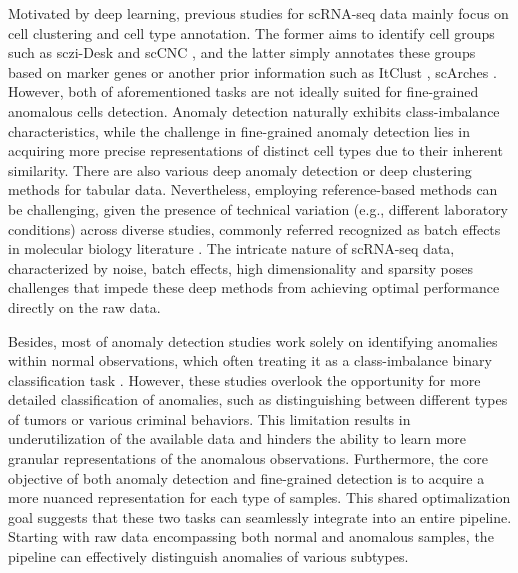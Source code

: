 \documentclass{article}
\begin{document}
Motivated by deep learning, previous studies for scRNA-seq data mainly focus on cell 
clustering and cell type annotation. The former aims to identify cell groups such as sczi-Desk \cite{sczi-Desk} 
and scCNC \cite{scCNC}, and the latter simply annotates these groups based on marker genes or another prior 
information such as ItClust \cite{ItClust}, scArches \cite{scArches}. 
However, both of aforementioned tasks are not ideally suited for fine-grained anomalous cells detection. 
Anomaly detection naturally exhibits class-imbalance characteristics, while the challenge 
in fine-grained anomaly detection lies in acquiring more precise representations of distinct cell types 
due to their inherent similarity. There are also various deep anomaly detection or deep 
clustering methods for tabular data. Nevertheless, employing reference-based methods can be challenging, given the presence of 
technical variation (e.g., different laboratory conditions) across diverse studies, 
commonly referred recognized as batch effects in molecular biology literature \cite{Polyphony}. 
The intricate nature of scRNA-seq data, characterized by noise, batch effects, high 
dimensionality and sparsity \cite{dands} poses challenges that impede these deep 
methods from achieving optimal performance directly on the raw data.

Besides, most of anomaly detection studies work solely on identifying anomalies within normal 
observations, which often treating it as a class-imbalance binary classification task \cite{OA}. 
However, these studies overlook the opportunity for more detailed classification of 
anomalies, such as distinguishing between different types of tumors or various criminal 
behaviors. This limitation results in underutilization of the available data and hinders 
the ability to learn more granular representations of the anomalous observations. 
Furthermore, the core objective of both anomaly detection and fine-grained detection is to 
acquire a more nuanced representation for each type of samples. This shared optimalization 
goal suggests that these two tasks can seamlessly integrate into an entire pipeline. 
Starting with raw data encompassing both normal and anomalous samples, the pipeline can 
effectively distinguish anomalies of various subtypes.
\end{document}
